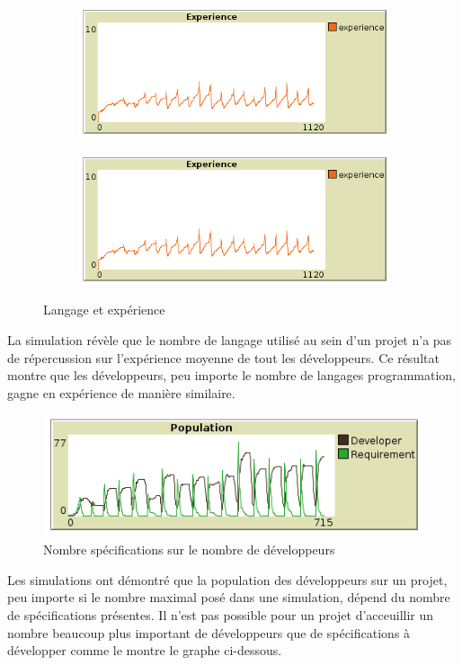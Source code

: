 \documentclass{article}
\begin{document}

\begin{figure}[H]
  \begin{subfigure}{.5\textwidth}
    \centering
    \includegraphics[width=1\linewidth]{pictures/langage40_experience.png}
  \end{subfigure}
  \begin{subfigure}{.5\textwidth}
    \centering
    \includegraphics[width=1\linewidth]{pictures/langage40_experience.png}
  \end{subfigure}
  \caption{Langage et expérience }
\end{figure}

La simulation révèle que le nombre de langage utilisé au sein d'un projet n'a pas de répercussion sur l'expérience moyenne de tout les développeurs.
Ce résultat montre que les développeurs, peu importe le nombre de langages programmation, gagne en expérience de manière similaire.


\begin{figure}[H]
  \centerline{\includegraphics[scale=1]{pictures/popu_requirement.png}}
  \caption{Nombre spécifications sur le nombre de développeurs}
\end{figure}
Les simulations ont démontré que la population des développeurs sur un projet, peu importe si le nombre maximal posé dans une simulation, dépend du nombre
de spécifications présentes. Il n'est pas possible pour un projet d'acceuillir un nombre beaucoup plus important de développeurs que de spécifications à développer comme le montre le graphe ci-dessous.
\end{document}
